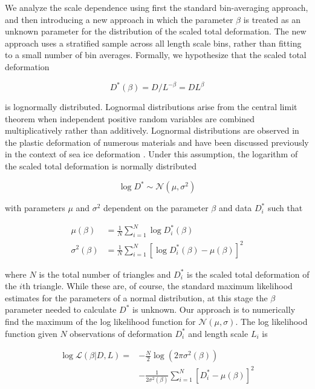 \documentclass[review, jog]{igs}
\begin{document}
We analyze the scale dependence using first the standard bin-averaging approach, and then introducing a new approach in which the parameter $\beta$ is treated as an unknown parameter for the distribution of the scaled total deformation. The new approach uses a stratified sample across all length scale bins, rather than fitting to a small number of bin averages. Formally, we hypothesize that the scaled total deformation 
\begin{linenomath*}
\begin{equation}
    D^*(\beta) = D/L^{-\beta} = DL^\beta
\end{equation}
\end{linenomath*}
is lognormally distributed.
Lognormal distributions arise from the central limit theorem when independent positive random variables are combined multiplicatively rather than additively. Lognormal distributions are observed in the plastic deformation of numerous materials \citep{tang2020_LognormalDistributiona, chen2021_WhyLocal} and have been discussed previously in the context of sea ice deformation \citep{Marsan2004}.
Under this assumption, the logarithm of the scaled total deformation is normally distributed 
\begin{linenomath*}
\begin{equation}
    \log D^* \sim \mathcal N(\mu, \sigma^2) \label{eqn:scaled_ln}
\end{equation}
\end{linenomath*}
with parameters $\mu$ and $\sigma^2$ dependent on the parameter $\beta$ and data $D_i^*$ such that
\begin{linenomath*}
\begin{align}
\mu(\beta) &= \frac 1N \sum_{i=1}^N \log D_i^*(\beta) \label{eqn:mu}\\
\sigma^2(\beta) &= \frac 1N \sum_{i=1}^N \left[\log D_i^*(\beta) - \mu(\beta)\right]^2 \label{eqn:sig}
\end{align}
\end{linenomath*}
where $N$ is the total number of triangles and $D_i^*$ is the scaled total deformation of the $i$th triangle. While these are, of course, the standard maximum likelihood estimates for the parameters of a normal distribution, at this stage the $\beta$ parameter needed to calculate $D^*$ is unknown. Our approach is to numerically find the maximum of the log likelihood function for $\mathcal N(\mu, \sigma)$.
The log likelihood function given $N$ observations of deformation $D_i^*$ and length scale $L_i$ is 
\begin{linenomath*}
\begin{align}
    \log \mathcal{L}(\beta | D, L)  = &  -\frac N2 \log (2\pi \sigma^2(\beta))   \nonumber \\ 
    & - \frac{1}{2\sigma^2(\beta)}\sum_{i=1}^N \left[D_i^* - \mu(\beta)\right]^2
\end{align}
\end{linenomath*}
\end{document}
